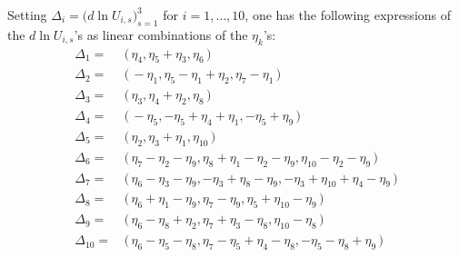 \documentclass[11pt]{amsart}
\begin{document}
Setting $\Delta_i= \big( d\ln U_{i,s} \big)_{s=1}^3$ for $i=1,\ldots,10$, one has the following expressions  of the $ d\ln U_{i,s}$'s as linear combinations of the $\eta_k$'s: 
\begin{align*}
\Delta_1= \, &\big( \, \eta_{4}, \eta_{5}+\eta_{3}, \eta_{6}\, \big) 
\\
\Delta_2= \, &\big( \, -\eta_{1}, \eta_{5}-\eta_{1}+\eta_{2}, \eta_{7}-\eta_{1}\, \big) 
\\
\Delta_3= \,&\big( \, \eta_{3}, \eta_{4}+\eta_{2}, \eta_{8}\, \big) 
\\
\Delta_4= \,&\big( \, -\eta_{5}, -\eta_{5}+\eta_{4}+\eta_{1}, -\eta_{5}+\eta_{9}\, \big) 
\\
\Delta_5= \,&
\big( \, \eta_{2}, \eta_{3}+\eta_{1}, \eta_{10}\, \big) 
\\
\Delta_6= \,&
\big( \, \eta_{7}-\eta_{2}-\eta_{9}, \eta_{8}+\eta_{1}-\eta_{2}-\eta_{9}, \eta_{10}-\eta_{2}-\eta_{9}\, \big) 
\\
\Delta_7= \,&
\big( \, \eta_{6}-\eta_{3}-\eta_{9}, -\eta_{3}+\eta_{8}-\eta_{9}, -\eta_{3}+\eta_{10}+\eta_{4}-\eta_{9}\, \big) 
\\
\Delta_8= \,&
\big( \, \eta_{6}+\eta_{1}-\eta_{9}, \eta_{7}-\eta_{9}, \eta_{5}+\eta_{10}-\eta_{9}\, \big) 
\\
\Delta_9= \,&
\big( \, \eta_{6}-\eta_{8}+\eta_{2}, \eta_{7}+\eta_{3}-\eta_{8}, \eta_{10}-\eta_{8}\, \big) 
\\
\Delta_{10}= \, &
\big( \, \eta_{6}-\eta_{5}-\eta_{8}, \eta_{7}-\eta_{5}+\eta_{4}-\eta_{8}, -\eta_{5}-\eta_{8}+\eta_{9}\, \big) 
%
%
\end{align*}
\end{document}
